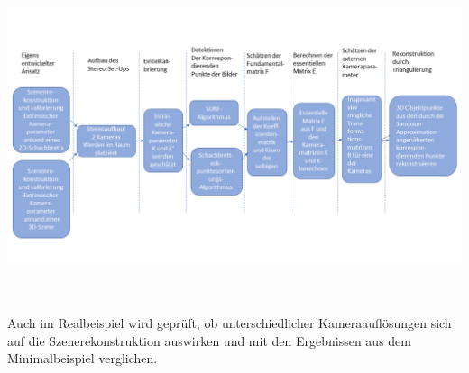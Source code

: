 \begin{minipage}{\linewidth}
	\centering
	\includegraphics[width=1.\linewidth]{images/ArbeitsProzessReal.png}
	\label{fig:ArbeitsProzessReal}
\end{minipage}\\ \\

Auch im Realbeispiel wird geprüft, ob unterschiedlicher Kameraauflösungen sich auf die Szenerekonstruktion auswirken und mit den Ergebnissen aus dem Minimalbeispiel verglichen.

%



